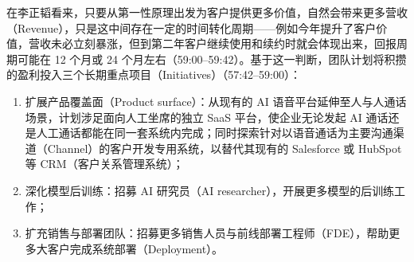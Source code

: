\documentclass[UTF8,a4paper,11pt,fontset=fandol]{ctexart}
\begin{document}
在李正韬看来，只要从第一性原理出发为客户提供更多价值，自然会带来更多营收（Revenue），只是这中间存在一定的时间转化周期——例如今年提升了客户价值，营收未必立刻暴涨，但到第二年客户继续使用和续约时就会体现出来，回报周期可能在 12 个月或 24 个月左右（59:00–59:42）。基于这一判断，团队计划将积攒的盈利投入三个长期重点项目（Initiatives）（57:42–59:00）：
\begin{enumerate}
\item 扩展产品覆盖面（Product surface）：从现有的 AI 语音平台延伸至人与人通话场景，计划涉足面向人工坐席的独立 SaaS 平台，使企业无论发起 AI 通话还是人工通话都能在同一套系统内完成；同时探索针对以语音通话为主要沟通渠道（Channel）的客户开发专用系统，以替代其现有的 Salesforce 或 HubSpot 等 CRM（客户关系管理系统）；
\item 深化模型后训练：招募 AI 研究员（AI researcher），开展更多模型的后训练工作；
\item 扩充销售与部署团队：招募更多销售人员与前线部署工程师（FDE），帮助更多大客户完成系统部署（Deployment）。
\end{enumerate}
\end{document}
